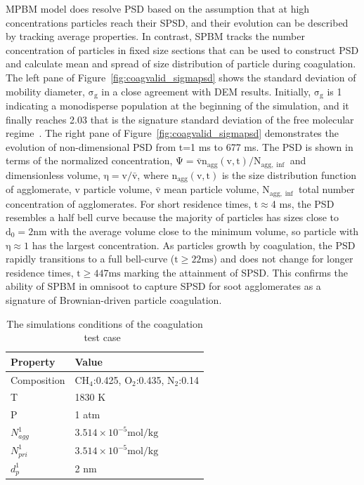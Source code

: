 MPBM model does resolve PSD based on the assumption that at high concentrations particles reach their SPSD, and their evolution can be described by tracking average properties. In contrast, SPBM tracks the number concentration of particles in fixed size sections that can be used to construct PSD and calculate mean and spread of size distribution of particle during coagulation. The left pane of Figure~\ref{fig:coagvalid_sigmapsd} shows the standard deviation of mobility diameter, $\mathrm{\sigma_g}$ in a close agreement with DEM results. Initially, $\mathrm{\sigma_g}$ is 1 indicating a monodisperse population at the beginning of the simulation, and it finally reaches 2.03 that is the signature standard deviation of the free molecular regime~\citep{vemury1995self}. The right pane of Figure~\ref{fig:coagvalid_sigmapsd} demonstrates the evolution of non-dimensional PSD from t=1 ms to 677 ms. The PSD is shown in terms of the normalized concentration, $\mathrm{\Psi= \bar{v}n_{agg}(v,t)/N_{agg,\inf}}$ and dimensionless volume, $\mathrm{\eta= v/ \bar{v}}$, where $\mathrm{n_{agg}(v,t)}$ is the size distribution function of agglomerate, $\mathrm{v}$ particle volume, $\mathrm{\bar{v}}$ mean particle volume, $\mathrm{N_{agg,\inf}}$ total number concentration of agglomerates. For short residence times, t$\approx$4 ms, the PSD resembles a half bell curve because the majority of particles has sizes close to $\mathrm{d_0=2 nm}$ with the average volume close to the minimum volume, so particle with $\mathrm{\eta\approx1}$ has the largest concentration. As particles growth by coagulation, the PSD rapidly transitions to a full bell-curve ($\mathrm{t\ge22 ms}$) and does not change for longer residence times, $\mathrm{t\ge447 ms}$ marking the attainment of SPSD. This confirms the ability of SPBM in omnisoot to capture SPSD for soot agglomerates as a signature of Brownian-driven particle coagulation.  

\begin{table}
	\caption{The simulations conditions of the coagulation test case~\citep{kholghy2021surface}}
	\label{tab:simcond_coagtest}
	\centering
	\begin{tabular}{l l}
		\hline
		\textbf{Property} & \textbf{Value} \\
		\hline
		Composition & $\mathrm{CH_4}$:0.425, $\mathrm{O_2}$:0.435, $\mathrm{N_2}$:0.14\\
		T & 1830 K\\
		P & 1 atm \\
		${N^1_{agg}}$ & $3.514\times10^{-5} \mathrm{mol/kg}$ \\ 
		${N^1_{pri}}$ & $3.514\times10^{-5} \mathrm{mol/kg}$\\
		${d^1_{p}}$ & 2 nm \\
		\hline
	\end{tabular}
\end{table}

